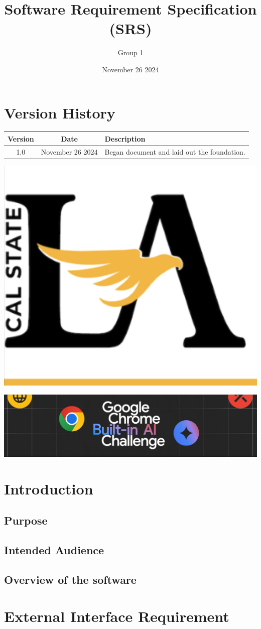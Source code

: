 \documentclass{article}
\title{Software Requirement Specification (SRS)}
\author{Group 1 }
\date{November 26 2024}
\begin{document}
\maketitle  
\pagebreak

\tableofcontents
\pagebreak

\section*{Version History}
\begin{longtable}{|c|c|p{10cm}|}
\hline
\textbf{Version} & \textbf{Date} & \textbf{Description} \\ \hline
1.0 & November 26 2024 & Began document and laid out the foundation.  \\ \hline
\end{longtable}
\pagebreak

\includegraphics[width=0.3\linewidth]{../logo/csula.png} 

\includegraphics[width=0.3\linewidth]{../logo/chromeai.png} 

\section{Introduction}
\subsection{Purpose}

\subsection{Intended Audience}

\subsection{Overview of the software}

\section{External Interface Requirement}
\end{document}
